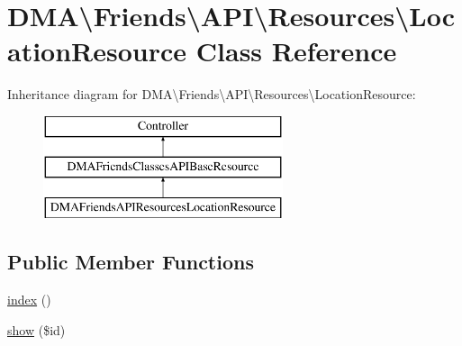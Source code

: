 \hypertarget{classDMA_1_1Friends_1_1API_1_1Resources_1_1LocationResource}{}\section{D\+M\+A\textbackslash{}Friends\textbackslash{}A\+P\+I\textbackslash{}Resources\textbackslash{}Location\+Resource Class Reference}
\label{classDMA_1_1Friends_1_1API_1_1Resources_1_1LocationResource}
Inheritance diagram for D\+M\+A\textbackslash{}Friends\textbackslash{}A\+P\+I\textbackslash{}Resources\textbackslash{}Location\+Resource\+:\begin{figure}[H]
\begin{center}
\leavevmode
\includegraphics[height=3.000000cm]{db/dd4/classDMA_1_1Friends_1_1API_1_1Resources_1_1LocationResource}
\end{center}
\end{figure}
\subsection*{Public Member Functions}
\begin{DoxyCompactItemize}
\item 
\hyperlink{classDMA_1_1Friends_1_1API_1_1Resources_1_1LocationResource_a947594c2d2081f6240d507f18093e006}{index} ()
\item 
\hyperlink{classDMA_1_1Friends_1_1API_1_1Resources_1_1LocationResource_aecefa261c2f86cc033cc214f609f99c3}{show} (\$id)
\end{DoxyCompactItemize}
